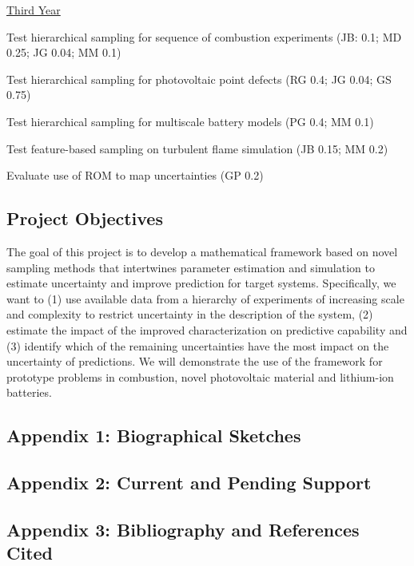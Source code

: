 \documentclass[11pt]{article}
\begin{document}
\underline{Third Year}
\begin{compactitem}
\setlength{\itemsep}{0pt}\setlength{\parskip}{0pt}\setlength{\parsep}{0pt}
\item Test hierarchical sampling for sequence of combustion experiments
(JB: 0.1; MD 0.25; JG 0.04; MM 0.1)
\item Test hierarchical sampling for photovoltaic point defects
(RG 0.4; JG 0.04; GS 0.75)
\item Test hierarchical sampling for multiscale battery models
(PG 0.4; MM 0.1)
\item Test feature-based sampling on turbulent flame simulation
(JB 0.15; MM 0.2)
\item Evaluate use of ROM to map uncertainties
(GP 0.2)
\end{compactitem}

\subsection*{Project Objectives}

The goal of this project is to develop a mathematical framework  
based on novel sampling methods that
intertwines parameter estimation and simulation 
to estimate uncertainty and improve prediction for target systems.
Specifically, we want to
(1) use available data from a hierarchy
of experiments of increasing scale and complexity to restrict
uncertainty in the description of the system, (2) estimate the impact of the improved characterization
on predictive capability and (3) identify which of the remaining uncertainties have the most impact
on the uncertainty of predictions.
We will demonstrate the use of the framework for prototype problems in combustion,
novel photovoltaic material and lithium-ion batteries.

\newpage
\subsection*{Appendix 1:  Biographical Sketches}


\newpage
\subsection*{Appendix 2:  Current and Pending Support}


\newpage
\subsection*{Appendix 3:  Bibliography and References Cited}

\end{document}

